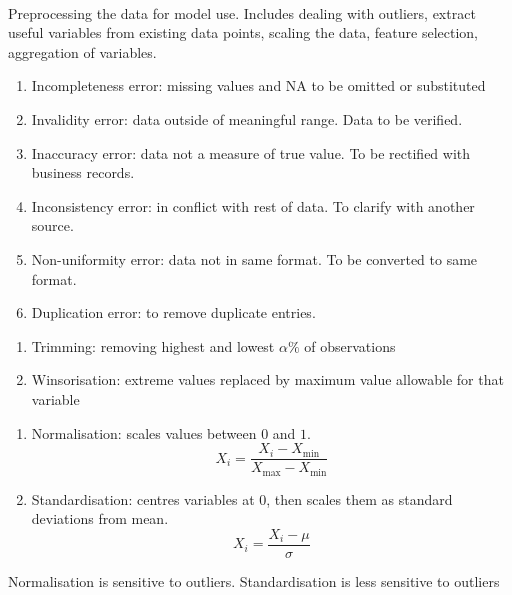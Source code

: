 \begin{definition} \\
Preprocessing the data for model use. Includes dealing with outliers, extract useful variables from existing data points, scaling the data, feature selection, aggregation of variables.
\end{definition}

\begin{definition} 
\begin{enumerate}[label=\roman*.]
\setlength{\itemsep}{0pt}
\item Incompleteness error: missing values and NA to be omitted or substituted
\item Invalidity error: data outside of meaningful range. Data to be verified.
\item Inaccuracy error: data not a measure of true value. To be rectified with business records.
\item Inconsistency error: in conflict with rest of data. To clarify with another source.
\item Non-uniformity error: data not in same format. To be converted to same format.
\item Duplication error: to remove duplicate entries.
\end{enumerate}
\end{definition}

\begin{remark} 
\begin{enumerate}[label=\roman*.]
\setlength{\itemsep}{0pt}
\item Trimming: removing highest and lowest $\alpha \%$ of observations
\item Winsorisation: extreme values replaced by maximum value allowable for that variable
\end{enumerate}
\end{remark}

\begin{remark} 
\begin{enumerate}[label=\roman*.]
\setlength{\itemsep}{0pt}
\item Normalisation: scales values between $0$ and $1$.
\begin{equation}
X_i = \frac{X_i - X_{\min}}{X_{\max} - X_{\min}} \nonumber
\end{equation}
\item Standardisation: centres variables at $0$, then scales them as standard deviations from mean.
\begin{equation}
X_i = \frac{X_i - \mu}{\sigma} \nonumber
\end{equation}
\end{enumerate}
Normalisation is sensitive to outliers. Standardisation is less sensitive to outliers
\end{remark}

